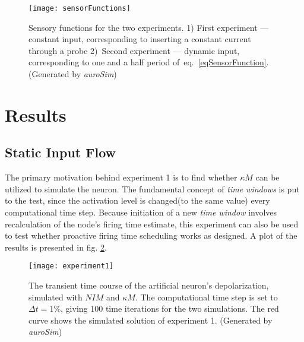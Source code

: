 \begin{figure}[hbt!p]
	\centering
	\centerline{ %
		\texttt{[image: sensorFunctions]}
	}
	\caption[Sensory functions for the two efficiency experiments.]{
				Sensory functions for the two experiments. 
				1) First experiment --- constant input, corresponding to inserting a constant current through a probe 
				\mbox{2) Second} experiment --- dynamic input, corresponding to one and a half period \mbox{of eq. \eqref{eqSensorFunction}}.
				(Generated by \emph{auroSim})	
			}
	\label{figSensorFunk}
\end{figure}



	\section{Results}
		\subsection{Static Input Flow}
		The primary motivation behind experiment 1 is to find whether $\kappa M$ can be utilized to simulate the neuron.
		The fundamental concept of \emph{time windows} is put to the test, since the activation level is changed(to the same value) every computational time step.
		Because initiation of a new \emph{time window} involves recalculation of the node's firing time estimate, this experiment can also be used to test whether proactive firing time scheduling works as designed. %
		A plot of the results is presented in fig. \ref{figExperiment1}.

\begin{figure}[hbt!p]
	\centering
	\centerline{
		\texttt{[image: experiment1]} 
	}
	\caption[Simulation results of experiment 1: static forcing function]{
			The transient time course of the artificial neuron's depolarization, simulated with $NIM$ and $\kappa M$.
			The computational time step is set to $\Delta t = 1\%$, giving 100 time iterations for the two simulations. %
			The red curve shows the simulated solution of experiment 1.
			(Generated by \emph{auroSim})
			}
	\label{figExperiment1}
\end{figure}

